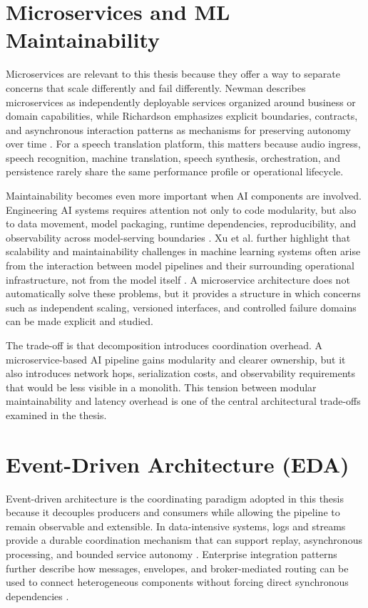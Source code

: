 \section{Microservices and ML Maintainability}
\label{sec:microservices_ml}

Microservices are relevant to this thesis because they offer a way to separate concerns that scale differently and fail differently. Newman describes microservices as independently deployable services organized around business or domain capabilities, while Richardson emphasizes explicit boundaries, contracts, and asynchronous interaction patterns as mechanisms for preserving autonomy over time \cite{newman2019monolith,richardson2018microservices}. For a speech translation platform, this matters because audio ingress, speech recognition, machine translation, speech synthesis, orchestration, and persistence rarely share the same performance profile or operational lifecycle.

Maintainability becomes even more important when AI components are involved. Engineering AI systems requires attention not only to code modularity, but also to data movement, model packaging, runtime dependencies, reproducibility, and observability across model-serving boundaries \cite{bass2023engineeringai}. Xu et al. further highlight that scalability and maintainability challenges in machine learning systems often arise from the interaction between model pipelines and their surrounding operational infrastructure, not from the model itself \cite{xu2025scalability}. A microservice architecture does not automatically solve these problems, but it provides a structure in which concerns such as independent scaling, versioned interfaces, and controlled failure domains can be made explicit and studied.

The trade-off is that decomposition introduces coordination overhead. A microservice-based AI pipeline gains modularity and clearer ownership, but it also introduces network hops, serialization costs, and observability requirements that would be less visible in a monolith. This tension between modular maintainability and latency overhead is one of the central architectural trade-offs examined in the thesis.

\section{Event-Driven Architecture (EDA)}
\label{sec:eda}

Event-driven architecture is the coordinating paradigm adopted in this thesis because it decouples producers and consumers while allowing the pipeline to remain observable and extensible. In data-intensive systems, logs and streams provide a durable coordination mechanism that can support replay, asynchronous processing, and bounded service autonomy \cite{kleppmann2017designing}. Enterprise integration patterns further describe how messages, envelopes, and broker-mediated routing can be used to connect heterogeneous components without forcing direct synchronous dependencies \cite{hohpe2004enterprise}.

